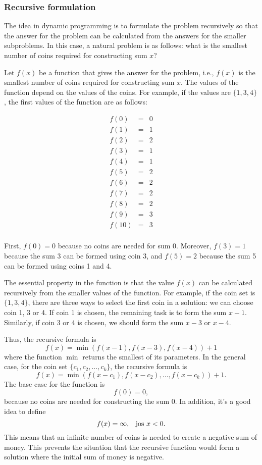 \subsubsection{Recursive formulation}

The idea in dynamic programming is to
formulate the problem recursively so
that the answer for the problem can be
calculated from the answers for the smaller
subproblems.
In this case, a natural problem is as follows:
what is the smallest number of coins
required for constructing sum $x$?

Let $f(x)$ be a function that gives the answer
for the problem, i.e., $f(x)$ is the smallest
number of coins required for constructing sum $x$.
The values of the function depend on the
values of the coins.
For example, if the values are $\{1,3,4\}$,
the first values of the function are as follows:

\[
\begin{array}{lcl}
f(0) & = & 0 \\
f(1) & = & 1 \\
f(2) & = & 2 \\
f(3) & = & 1 \\
f(4) & = & 1 \\
f(5) & = & 2 \\
f(6) & = & 2 \\
f(7) & = & 2 \\
f(8) & = & 2 \\
f(9) & = & 3 \\
f(10) & = & 3 \\
\end{array}
\]

First, $f(0)=0$ because no coins are needed
for sum $0$.
Moreover, $f(3)=1$ because the sum $3$
can be formed using coin 3,
and $f(5)=2$ because the sum 5 can
be formed using coins 1 and 4.

The essential property in the function is
that the value $f(x)$ can be calculated
recursively from the smaller values of the function.
For example, if the coin set is $\{1,3,4\}$,
there are three ways to select the first coin
in a solution: we can choose coin 1, 3 or 4.
If coin 1 is chosen, the remaining task is to
form the sum $x-1$.
Similarly, if coin 3 or 4 is chosen,
we should form the sum $x-3$ or $x-4$.

Thus, the recursive formula is
\[f(x) = \min(f(x-1),f(x-3),f(x-4))+1\]
where the function $\min$ returns the smallest
of its parameters.
In the general case, for the coin set
$\{c_1,c_2,\ldots,c_k\}$,
the recursive formula is
\[f(x) = \min(f(x-c_1),f(x-c_2),\ldots,f(x-c_k))+1.\]
The base case for the function is
\[f(0)=0,\]
because no coins are needed for constructing
the sum 0.
In addition, it's a good idea to define
\[f(x)=\infty,\hspace{8px}\textrm{jos $x<0$}.\]
This means that an infinite number of coins
is needed to create a negative sum of money.
This prevents the situation that the recursive
function would form a solution where the
initial sum of money is negative.

